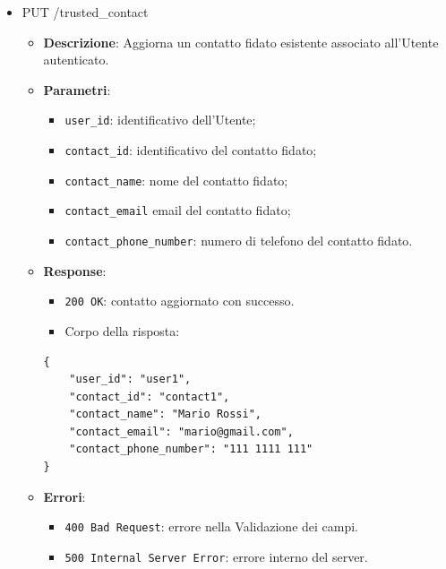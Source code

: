 \documentclass[a4paper,12pt]{article}
\newcommand{\code}[1]{{\ttfamily\textcolor{purple!85!black}{#1}}}
\begin{document}
\begin{itemize}
\begin{itemize}
            \item \textbf{Errori}:
            \begin{itemize}
                \item \texttt{500 Internal Server Error}: errore interno del server.
            \end{itemize}
        \end{itemize}

    \item \code{PUT /trusted\_contact}
        \begin{itemize}
            \item \textbf{Descrizione}: Aggiorna un contatto fidato esistente associato all’Utente autenticato.
            
            \item \textbf{Parametri}:
            \begin{itemize}
                \item \texttt{user\_id}: identificativo dell’Utente;
                \item \texttt{contact\_id}: identificativo del contatto fidato;
                \item \texttt{contact\_name}: nome del contatto fidato;
                \item \texttt{contact\_email} email del contatto fidato;
                \item \texttt{contact\_phone\_number}: numero di telefono del contatto fidato.
            \end{itemize}

            \item \textbf{Response}:
            \begin{itemize}
                \item \texttt{200 OK}: contatto aggiornato con successo.
                \item Corpo della risposta:

            \end{itemize}
\begin{verbatim}
{
    "user_id": "user1",
    "contact_id": "contact1",
    "contact_name": "Mario Rossi",
    "contact_email": "mario@gmail.com",
    "contact_phone_number": "111 1111 111"
}
\end{verbatim}
            \item \textbf{Errori}:
            \begin{itemize}
                \item \texttt{400 Bad Request}: errore nella Validazione dei campi.
                \item \texttt{500 Internal Server Error}: errore interno del server.
            \end{itemize}
        \end{itemize}


\end{itemize}
\end{document}
